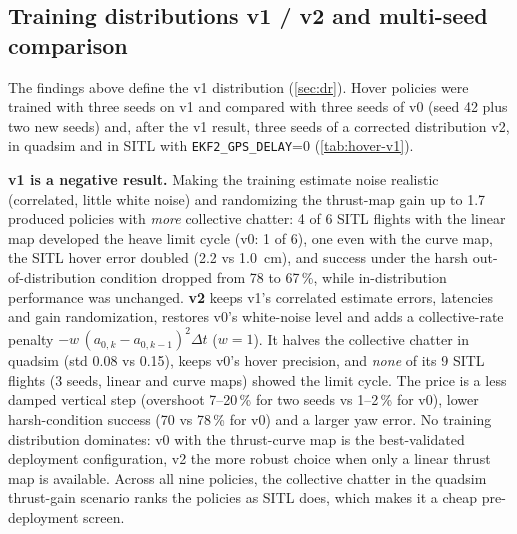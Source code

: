 \subsection{Training distributions v1 / v2 and multi-seed comparison}\label{sec:v1}
The findings above define the v1 distribution (\cref{sec:dr}). Hover policies were trained with three seeds on v1 and
compared with three seeds of v0 (seed 42 plus two new seeds) and, after the v1 result, three seeds of a corrected
distribution v2, in quadsim and in SITL with \texttt{EKF2\_GPS\_DELAY}=0 (\cref{tab:hover-v1}).
\begin{table}[!htbp]\centering\small
\resizebox{\linewidth}{!}{}
\caption{Hover policies trained on v0, v1 and v2, mean $\pm$ std over 3 seeds. Quadsim: 1000 episodes per seed and
condition; scenario: hover + steps with nominal dynamics and a thrust-map gain $g$ (1.6 = linear map on the gz x500).
SITL: limit-cycle runs = collective std $>0.1$ in hover. Source: \texttt{docs/results/hover\_v1.json}.}
\label{tab:hover-v1}
\end{table}
\textbf{v1 is a negative result.} Making the training estimate noise realistic (correlated, little white noise) and
randomizing the thrust-map gain up to 1.7 produced policies with \emph{more} collective chatter: 4 of 6 SITL flights with
the linear map developed the heave limit cycle (v0: 1 of 6), one even with the curve map, the SITL hover error doubled
(2.2 vs \SI{1.0}{cm}), and success under the harsh out-of-distribution condition dropped from 78 to 67\,\%, while
in-distribution performance was unchanged. \textbf{v2} keeps v1's correlated estimate errors, latencies and gain
randomization, restores v0's white-noise level and adds a collective-rate penalty
$-w\,(a_{0,k}-a_{0,k-1})^2\Delta t$ ($w=1$). It halves the collective chatter in quadsim (std 0.08 vs 0.15), keeps
v0's hover precision, and \emph{none} of its 9 SITL flights (3 seeds, linear and curve maps) showed the limit cycle.
The price is a less damped vertical step (overshoot 7--20\,\% for two seeds vs 1--2\,\% for v0), lower harsh-condition
success (70 vs 78\,\% for v0) and a larger yaw error. No training distribution dominates: v0 with the thrust-curve map is the
best-validated deployment configuration, v2 the more robust choice when only a linear thrust map is available.
Across all nine policies, the collective chatter in the quadsim thrust-gain scenario ranks the policies as SITL does,
which makes it a cheap pre-deployment screen.


